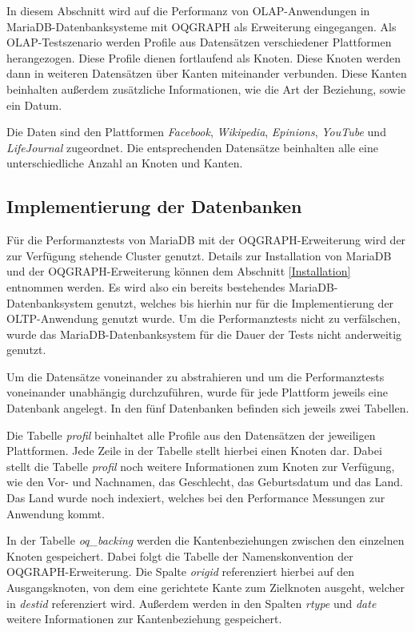 In diesem Abschnitt wird auf die Performanz von OLAP-Anwendungen in MariaDB-Datenbanksysteme mit OQGRAPH als Erweiterung eingegangen. Als OLAP-Testszenario werden Profile aus Datensätzen verschiedener Plattformen herangezogen. Diese Profile dienen fortlaufend als Knoten. Diese Knoten werden dann in weiteren Datensätzen über Kanten miteinander verbunden. Diese Kanten beinhalten außerdem zusätzliche Informationen, wie die Art der Beziehung, sowie ein Datum.

Die Daten sind den Plattformen \emph{Facebook}, \emph{Wikipedia}, \emph{Epinions}, \emph{YouTube} und \emph{LifeJournal} zugeordnet. Die entsprechenden Datensätze beinhalten alle eine unterschiedliche Anzahl an Knoten und Kanten.

\subsection{Implementierung der Datenbanken}

Für die Performanztests von MariaDB mit der OQGRAPH-Erweiterung wird der zur Verfügung stehende Cluster genutzt. Details zur Installation von MariaDB und der OQGRAPH-Erweiterung können dem Abschnitt \ref{Installation} entnommen werden. Es wird also ein bereits bestehendes MariaDB-Datenbanksystem genutzt, welches bis hierhin nur für die Implementierung der OLTP-Anwendung genutzt wurde. Um die Performanztests nicht zu verfälschen, wurde das MariaDB-Datenbanksystem für die Dauer der Tests nicht anderweitig genutzt.

Um die Datensätze voneinander zu abstrahieren und um die Performanztests voneinander unabhängig durchzuführen, wurde für jede Plattform jeweils eine Datenbank angelegt. In den fünf Datenbanken befinden sich jeweils zwei Tabellen.

Die Tabelle \emph{profil} beinhaltet alle Profile aus den Datensätzen der jeweiligen Plattformen. Jede Zeile in der Tabelle stellt hierbei einen Knoten dar. Dabei stellt die Tabelle \emph{profil} noch weitere Informationen zum Knoten zur Verfügung, wie den Vor- und Nachnamen, das Geschlecht, das Geburtsdatum und das Land. Das Land wurde noch indexiert, welches bei den Performance Messungen zur Anwendung kommt.

In der Tabelle \emph{oq\_backing} werden die Kantenbeziehungen zwischen den einzelnen Knoten gespeichert. Dabei folgt die Tabelle der Namenskonvention der OQGRAPH-Erweiterung. Die Spalte \emph{origid} referenziert hierbei auf den Ausgangsknoten, von dem eine gerichtete Kante zum Zielknoten ausgeht, welcher in \emph{destid} referenziert wird. Außerdem werden in den Spalten \emph{rtype} und \emph{date} weitere Informationen zur Kantenbeziehung gespeichert.

